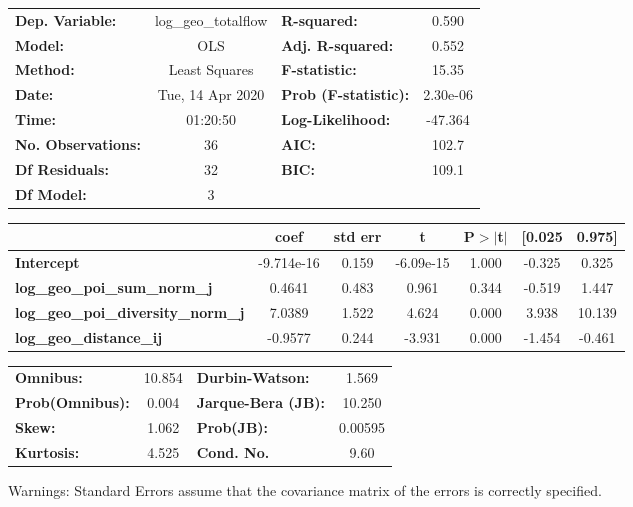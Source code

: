 \begin{center}
\begin{tabular}{lclc}
\toprule
\textbf{Dep. Variable:}                    & log\_geo\_totalflow & \textbf{  R-squared:         } &     0.590   \\
\textbf{Model:}                            &         OLS         & \textbf{  Adj. R-squared:    } &     0.552   \\
\textbf{Method:}                           &    Least Squares    & \textbf{  F-statistic:       } &     15.35   \\
\textbf{Date:}                             &   Tue, 14 Apr 2020  & \textbf{  Prob (F-statistic):} &  2.30e-06   \\
\textbf{Time:}                             &       01:20:50      & \textbf{  Log-Likelihood:    } &   -47.364   \\
\textbf{No. Observations:}                 &            36       & \textbf{  AIC:               } &     102.7   \\
\textbf{Df Residuals:}                     &            32       & \textbf{  BIC:               } &     109.1   \\
\textbf{Df Model:}                         &             3       & \textbf{                     } &             \\
\bottomrule
\end{tabular}
\begin{tabular}{lcccccc}
                                           & \textbf{coef} & \textbf{std err} & \textbf{t} & \textbf{P$> |$t$|$} & \textbf{[0.025} & \textbf{0.975]}  \\
\midrule
\textbf{Intercept}                         &   -9.714e-16  &        0.159     & -6.09e-15  &         1.000        &       -0.325    &        0.325     \\
\textbf{log\_geo\_poi\_sum\_norm\_j}       &       0.4641  &        0.483     &     0.961  &         0.344        &       -0.519    &        1.447     \\
\textbf{log\_geo\_poi\_diversity\_norm\_j} &       7.0389  &        1.522     &     4.624  &         0.000        &        3.938    &       10.139     \\
\textbf{log\_geo\_distance\_ij}            &      -0.9577  &        0.244     &    -3.931  &         0.000        &       -1.454    &       -0.461     \\
\bottomrule
\end{tabular}
\begin{tabular}{lclc}
\textbf{Omnibus:}       & 10.854 & \textbf{  Durbin-Watson:     } &    1.569  \\
\textbf{Prob(Omnibus):} &  0.004 & \textbf{  Jarque-Bera (JB):  } &   10.250  \\
\textbf{Skew:}          &  1.062 & \textbf{  Prob(JB):          } &  0.00595  \\
\textbf{Kurtosis:}      &  4.525 & \textbf{  Cond. No.          } &     9.60  \\
\bottomrule
\end{tabular}
\end{center}

Warnings: \newline
 [1] Standard Errors assume that the covariance matrix of the errors is correctly specified.